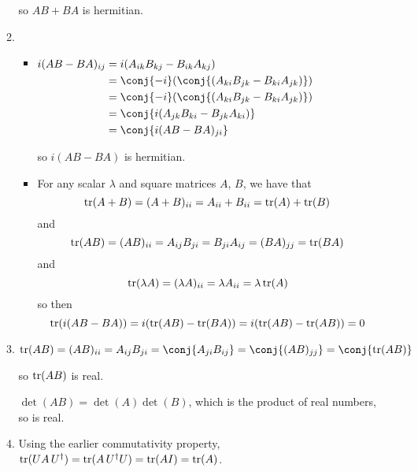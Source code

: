 \documentclass[fleqn,a4paper,11pt]{article}
\begin{document}
\begin{enumerate}[label=\textbf{\arabic*.}]
\begin{enumerate}[label=(\roman*)]
     so \(AB + BA\) is hermitian.
    \item
     \begin{itemize}
      \item \(
       \begin{aligned}[t]
        i(AB - BA)_{ij}
         &= i(A_{ik} B_{kj} - B_{ik} A_{kj}) \\
         &= \conj{-i}(\conj{(A_{ki} B_{jk} - B_{ki} A_{jk})}) \\
         &= \conj{-i}(\conj{(A_{ki} B_{jk} - B_{ki} A_{jk})}) \\
         &= \conj{i(A_{jk} B_{ki} - B_{jk} A_{ki})} \\
         &= \conj{i(AB - BA)_{ji}}
       \end{aligned}\)

       so \(i(AB - BA)\) is hermitian.
      \item
       For any scalar \(\lambda\) and square matrices \(A\), \(B\), we have that
       \begin{equation*}
        \operatorname{tr}(A + B) = (A + B)_{ii} = A_{ii} + B_{ii} = \operatorname{tr}(A) + \operatorname{tr}(B)
       \end{equation*}
       and
       \begin{equation*}
        \operatorname{tr}(AB) = (AB)_{ii} = A_{ij} B_{ji} = B_{ji} A_{ij} = (BA)_{jj}
         = \operatorname{tr}(BA)
       \end{equation*}
       and
       \begin{equation*}
        \operatorname{tr}(\lambda A) = (\lambda A)_{ii} = \lambda A_{ii} = \lambda \operatorname{tr}(A)
       \end{equation*}
       so then
       \begin{equation*}
        \operatorname{tr}(i(AB - BA)) = i(\operatorname{tr}(AB) - \operatorname{tr}(BA)) = i(\operatorname{tr}(AB) - \operatorname{tr}(AB)) = 0
       \end{equation*}
     \end{itemize}
    \item \(
      \tr(AB) = (AB)_{ii} = A_{ij} B_{ji} = \conj{A_{ji} B_{ij}}
       = \conj{(AB)_{jj}} = \conj{\tr(AB)}
      \)

      so \(\operatorname{tr}(AB)\) is real.

      \(\det(AB) = \det(A)\det(B)\), which is the product of real numbers, so is
      real.
     \item Using the earlier commutativity property,
      \(\operatorname{tr}(UA\,U^\dag) = \operatorname{tr}(A\,U^\dag U) = \operatorname{tr}(AI) = \operatorname{tr}(A)\).


\end{enumerate}
\end{enumerate}
\end{document}
